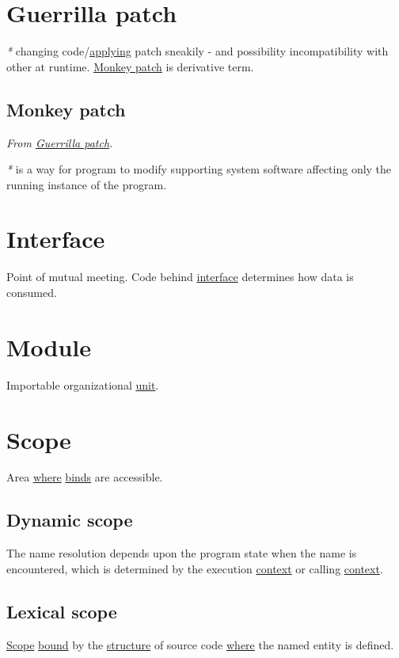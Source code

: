 \documentclass[a4paper,14pt,oneside]{book}
\begin{document}
\section{\label{orge6a129d}Guerrilla patch}
\label{sec:org30d47b7}
\emph{*} changing code/\hyperref[org5184055]{applying} patch sneakily - and possibility incompatibility with other at runtime.
\hyperref[orge5315ec]{Monkey patch} is derivative term.

\subsection{\label{orge5315ec}Monkey patch}
\label{sec:org4bc5e62}
\emph{From \hyperref[orge6a129d]{Guerrilla patch}.}

\emph{*} is a way for program to modify supporting system software affecting only the running instance of the program.

\section{\label{orgd169f29}Interface}
\label{sec:orgf1c1c70}
Point of mutual meeting. Code behind \hyperref[orgd169f29]{interface} determines how data is consumed.

\section{\label{orgfad88dd}Module}
\label{sec:org9fbe8b1}
Importable organizational \hyperref[org13a1f38]{unit}.

\section{\label{orgeca725f}Scope}
\label{sec:orgc5da9d1}
Area \hyperref[orgb660a1e]{where} \hyperref[org6c9b13f]{binds} are accessible.

\subsection{\label{org094d7b8}Dynamic scope}
\label{sec:org78eba3b}
The name resolution depends upon the program state when the name is encountered, which is determined by the execution \hyperref[orgd011e2e]{context} or calling \hyperref[orgd011e2e]{context}.

\subsection{\label{org71d9536}Lexical scope}
\label{sec:org40aadd5}
\hyperref[orgeca725f]{Scope} \hyperref[org74a9a52]{bound} by the \hyperref[org60f4b33]{structure} of source code \hyperref[orgb660a1e]{where} the named entity is defined.
\end{document}
